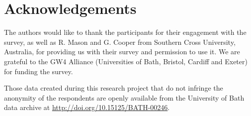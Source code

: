 \documentclass[english,submission]{programming}
\begin{document}
\section*{Acknowledgements}

The authors would like to thank the participants for their engagement
with the survey, as well as R. Mason and G. Cooper from Southern Cross
University, Australia, for providing us with their survey and
permission to use it. We are grateful to the GW4 Alliance
(Universities of Bath, Bristol, Cardiff and Exeter) for funding the
survey.

Those data created during this research project that do not infringe
the anonymity of the respondents are openly available from the
University of Bath data archive at
\url{http://doi.org/10.15125/BATH-00246}.


\end{document}
